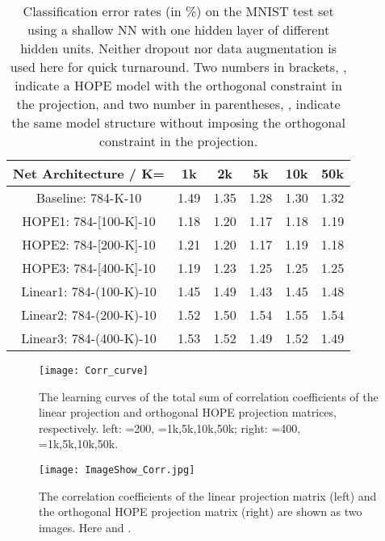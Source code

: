\documentclass[11pt]{article}
\begin{document}
\begin{table}
	\centering
	\caption{Classification error rates (in \%) on the MNIST test set using a shallow NN with one hidden layer of different hidden units. Neither dropout nor data augmentation is used here for quick turnaround. Two numbers in brackets, , indicate a HOPE model with the orthogonal constraint in the projection, and two number in parentheses, , indicate the same model structure without imposing the orthogonal constraint in the projection.}
	\begin{tabular}{|c|c|c|c|c|c|} \hline
		 Net Architecture / K= &  1k& 2k &5k  &10k  &50k  \\ \hline
		 Baseline:  784-K-10 & 1.49  & 1.35 & 1.28 & 1.30 & 1.32 \\ \hline \hline
		 HOPE1: 784-[100-K]-10 & 1.18 & 1.20 & 1.17 & 1.18 & 1.19 \\ \hline
		 HOPE2: 784-[200-K]-10& 1.21 & 1.20 & 1.17 & 1.19 &  1.18\\ \hline
		 HOPE3: 784-[400-K]-10& 1.19 & 1.23 &  1.25& 1.25 & 1.25 \\ \hline \hline
		 Linear1: 784-(100-K)-10 & 1.45 & 1.49 & 1.43 & 1.45 & 1.48 \\ \hline
		 Linear2: 784-(200-K)-10 & 1.52 & 1.50 &  1.54& 1.55 & 1.54 \\ \hline
		 Linear3: 784-(400-K)-10& 1.53 & 1.52 & 1.49 & 1.52 & 1.49 \\ \hline
		\end{tabular} 
		\label{MNIST_SL_1}
\end{table}

\begin{figure}
	\centering
	\texttt{[image: Corr\_curve]}
	\caption{The learning curves of the total sum of correlation coefficients  of the linear projection and orthogonal HOPE projection matrices, respectively. left: =200, =1k,5k,10k,50k; right: =400, =1k,5k,10k,50k.}
	\label{fig:Corr_curve}
\end{figure}

\begin{figure}
\centering
\texttt{[image: ImageShow\_Corr.jpg]}
\caption{The correlation coefficients of the linear projection matrix (left) and the orthogonal HOPE projection matrix (right) are shown as two images. Here  and . }
\label{fig:ImageShow_Corr}
\end{figure} 
\end{document}
